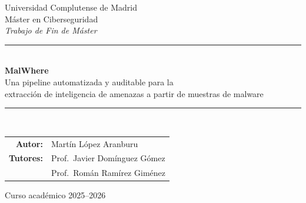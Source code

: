 \documentclass[11pt,a4paper]{article}
\begin{document}
\begin{titlepage}
\centering
\vspace*{1.5cm}

{\large Universidad Complutense de Madrid}\\[0.2cm]
{\normalsize M\'aster en Ciberseguridad}\\[1.5cm]

{\large \textit{Trabajo de Fin de M\'aster}}\\[1cm]

\rule{\linewidth}{0.5pt}\\[0.4cm]
{\Huge \bfseries MalWhere}\\[0.3cm]
{\Large Una pipeline automatizada y auditable para la\\ extracci\'on de inteligencia de amenazas a partir de muestras de malware}\\[0.4cm]
\rule{\linewidth}{0.5pt}\\[1.5cm]

\begin{tabular}{rl}
\textbf{Autor:} & Mart\'in L\'opez Aranburu \\[0.3cm]
\textbf{Tutores:} & Prof.\ Javier Dom\'inguez G\'omez \\
                   & Prof.\ Rom\'an Ram\'irez Gim\'enez \\
\end{tabular}

\vfill

{\normalsize Curso acad\'emico 2025--2026}

\end{titlepage}

\newpage
\tableofcontents
\newpage



\clearpage

\clearpage

\clearpage

\clearpage

\clearpage

\clearpage

\clearpage

\clearpage


\clearpage
{}


\appendix
\clearpage

\end{document}
